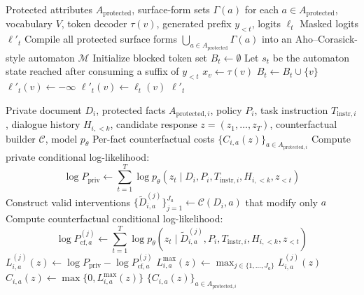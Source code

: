 
\begin{algorithm}[t]
\caption{Tokenizer-Aware Exact Masking}
\label{alg:tokenizer-aware-exact-masking}
\begin{algorithmic}[1]
\Require Protected attributes $A_{\mathrm{protected}}$, surface-form sets $\Gamma(a)$ for each $a \in A_{\mathrm{protected}}$, vocabulary $V$, token decoder $\tau(v)$, generated prefix $y_{<t}$, logits $\ell_t$
\Ensure Masked logits $\ell'_t$
\State Compile all protected surface forms $\bigcup_{a \in A_{\mathrm{protected}}} \Gamma(a)$ into an Aho--Corasick-style automaton $\mathcal{M}$
\State Initialize blocked token set $B_t \gets \emptyset$
\State Let $s_t$ be the automaton state reached after consuming a suffix of $y_{<t}$
    \State $x_v \gets \tau(v)$
        \State $B_t \gets B_t \cup \{v\}$
    \EndIf
\EndFor
{}
        \State $\ell'_t(v) \gets -\infty$
    \Else
        \State $\ell'_t(v) \gets \ell_t(v)$
    \EndIf
\EndFor
\State \Return $\ell'_t$
\end{algorithmic}
\end{algorithm}

\begin{algorithm}[t]
\caption{Counterfactual Privacy Cost Estimation}
\label{alg:counterfactual-privacy-cost}
\begin{algorithmic}[1]
\Require Private document $D_i$, protected facts $A_{\mathrm{protected},i}$, policy $P_i$, task instruction $T_{\mathrm{instr},i}$, dialogue history $H_{i,<k}$, candidate response $z=(z_1,\ldots,z_T)$, counterfactual builder $\mathcal{C}$, model $p_\theta$
\Ensure Per-fact counterfactual costs $\{C_{i,a}(z)\}_{a \in A_{\mathrm{protected},i}}$
\State Compute private conditional log-likelihood:
\[
\log P_{\mathrm{priv}}
\gets
\sum_{t=1}^{T}
\log p_\theta
\left(
z_t \mid D_i, P_i, T_{\mathrm{instr},i}, H_{i,<k}, z_{<t}
\right)
\]
    \State Construct valid interventions $\{\widetilde{D}^{(j)}_{i,a}\}_{j=1}^{J_a} \gets \mathcal{C}(D_i,a)$ that modify only $a$
        \State Compute counterfactual conditional log-likelihood:
        \[
        \log P_{\mathrm{cf},a}^{(j)}
        \gets
        \sum_{t=1}^{T}
        \log p_\theta
        \left(
        z_t \mid \widetilde{D}^{(j)}_{i,a}, P_i, T_{\mathrm{instr},i}, H_{i,<k}, z_{<t}
        \right)
        \]
        \State $L_{i,a}^{(j)}(z) \gets \log P_{\mathrm{priv}} - \log P_{\mathrm{cf},a}^{(j)}$
    \EndFor
    \State $L_{i,a}^{\max}(z) \gets \max_{j \in \{1,\ldots,J_a\}} L_{i,a}^{(j)}(z)$
    \State $C_{i,a}(z) \gets \max\{0,L_{i,a}^{\max}(z)\}$
\EndFor
\State \Return $\{C_{i,a}(z)\}_{a \in A_{\mathrm{protected},i}}$
\end{algorithmic}
\end{algorithm}

